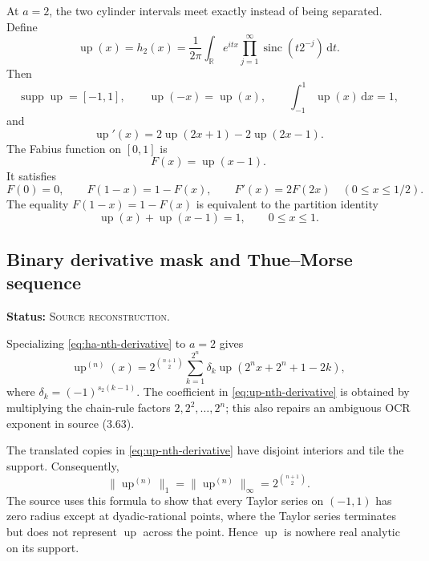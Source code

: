 \documentclass[11pt]{article}
\theoremstyle{definition}
\theoremstyle{remark}
\newcommand{\Up}{\operatorname{up}}
\newcommand{\sinc}{\operatorname{sinc}}
\newcommand{\supp}{\operatorname{supp}}
\newcommand{\R}{\mathbb{R}}
\newcommand{\dd}{\,\mathrm{d}}
\newcommand{\SourceStatus}{\textcolor{SourceBlue}{\textsc{Source reconstruction}}}
\newcommand{\status}[1]{\par\smallskip\noindent\textbf{Status:} #1.\par\smallskip}
\newcommand{\bitsum}{s_2}
\begin{document}
At \(a=2\), the two cylinder intervals meet exactly instead of being separated.  Define
\begin{equation}
  \Up(x)=h_2(x)=\frac1{2\pi}\int_{\R}e^{itx}
     \prod_{j=1}^{\infty}\sinc(t2^{-j})\dd t.
  \label{eq:up-fourier}
\end{equation}
Then
\begin{equation}
  \supp\Up=[-1,1],\qquad \Up(-x)=\Up(x),\qquad
  \int_{-1}^{1}\Up(x)\dd x=1,
  \label{eq:up-basic}
\end{equation}
and
\begin{equation}
  \Up'(x)=2\Up(2x+1)-2\Up(2x-1).
  \label{eq:up-dfe}
\end{equation}
The Fabius function on \([0,1]\) is
\begin{equation}
  F(x)=\Up(x-1).
  \label{eq:fabius-up}
\end{equation}
It satisfies
\begin{equation}
  F(0)=0,
  \qquad F(1-x)=1-F(x),
  \qquad F'(x)=2F(2x)\quad(0\le x\le1/2).
  \label{eq:fabius-functional}
\end{equation}
The equality \(F(1-x)=1-F(x)\) is equivalent to the partition identity
\begin{equation}
  \Up(x)+\Up(x-1)=1,
  \qquad 0\le x\le1.
  \label{eq:up-partition}
\end{equation}

\subsection{Binary derivative mask and Thue--Morse sequence}
\status{\SourceStatus}

Specializing \eqref{eq:ha-nth-derivative} to \(a=2\) gives
\begin{equation}
  \Up^{(n)}(x)=2^{\binom{n+1}{2}}
  \sum_{k=1}^{2^n}\delta_k
  \Up\!\left(2^n x+2^n+1-2k\right),
  \label{eq:up-nth-derivative}
\end{equation}
where \(\delta_k=(-1)^{\bitsum(k-1)}\).  The coefficient in \eqref{eq:up-nth-derivative} is obtained by multiplying the chain-rule factors \(2,2^2,\ldots,2^n\); this also repairs an ambiguous OCR exponent in source (3.63).

The translated copies in \eqref{eq:up-nth-derivative} have disjoint interiors and tile the support.  Consequently,
\begin{equation}
  \|\Up^{(n)}\|_1=\|\Up^{(n)}\|_\infty
  =2^{\binom{n+1}{2}}.
  \label{eq:up-norms}
\end{equation}
The source uses this formula to show that every Taylor series on \((-1,1)\) has zero radius except at dyadic-rational points, where the Taylor series terminates but does not represent \(\Up\) across the point.  Hence \(\Up\) is nowhere real analytic on its support.
\end{document}
